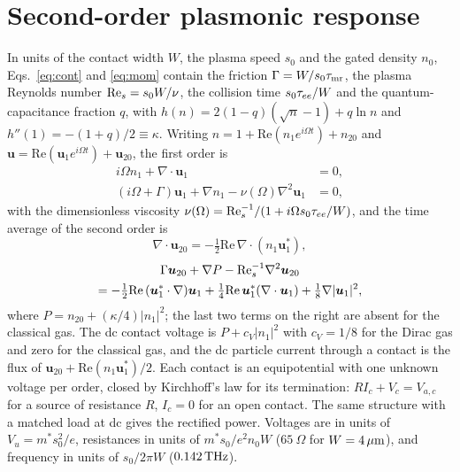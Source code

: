 \section{Second-order plasmonic response}
\label{app:perturbation}

In units of the contact width $W$, the plasma speed $s_{0}$ and the gated
density $n_{0}$, Eqs.~\eqref{eq:cont} and \eqref{eq:mom} contain the
friction $\Gamma=W/s_{0}\tau_{\mathrm{mr}}$, the plasma Reynolds number
$\mathrm{Re}_{s}=s_{0}W/\nu$, the collision time $s_{0}\tau_{ee}/W$ and the
quantum-capacitance fraction $q$, with
$h(n)=2(1-q)(\sqrt{n}-1)+q\ln n$ and $h''(1)=-(1+q)/2\equiv\kappa$. Writing
$n=1+\mathrm{Re}(n_{1}e^{i\Omega t})+n_{20}$ and
$\bm{u}=\mathrm{Re}(\bm{u}_{1}e^{i\Omega t})+\bm{u}_{20}$, the first order is
\begin{align}
i\Omega n_{1}+\nabla\cdot\bm{u}_{1}&=0,\\
(i\Omega+\Gamma)\bm{u}_{1}+\nabla n_{1}-\nu(\Omega)\nabla^{2}\bm{u}_{1}&=0,
\end{align}
with the dimensionless viscosity
$\nu(\Omega)=\mathrm{Re}_{s}^{-1}/(1+i\Omega s_{0}\tau_{ee}/W)$, and the time
average of the second order is
\begin{equation}
\nabla\cdot\bm{u}_{20}=-\tfrac12\mathrm{Re}\,\nabla\cdot(n_{1}\bm{u}_{1}^{*}),
\end{equation}
\begin{multline}
\Gamma\bm{u}_{20}+\nabla P-\mathrm{Re}_{s}^{-1}\nabla^{2}\bm{u}_{20}\\
=-\tfrac12\mathrm{Re}\,(\bm{u}_{1}^{*}\cdot\nabla)\bm{u}_{1}
+\tfrac14\mathrm{Re}\,\bm{u}_{1}^{*}(\nabla\cdot\bm{u}_{1})
+\tfrac18\nabla|\bm{u}_{1}|^{2},
\end{multline}
where $P=n_{20}+(\kappa/4)|n_{1}|^{2}$; the last two terms on the right
are absent for the classical gas. The dc contact voltage is
$P+c_{V}|n_{1}|^{2}$ with $c_{V}=1/8$ for the Dirac gas and zero for
the classical gas, and the dc particle current through a contact is the flux of
$\bm{u}_{20}+\mathrm{Re}(n_{1}\bm{u}_{1}^{*})/2$. Each contact is an
equipotential with one unknown voltage per order, closed by Kirchhoff's law
for its termination: $R I_{c}+V_{c}=V_{a,c}$ for a source of resistance $R$,
$I_{c}=0$ for an open contact. The same structure with a matched load at dc
gives the rectified power. Voltages are in units of
$V_{u}=m^{*}s_{0}^{2}/e$, resistances in units of
$m^{*}s_{0}/e^{2}n_{0}W$ ($65\ \Omega$ for $W=4\,\mu\mathrm{m}$), and frequency in units
of $s_{0}/2\pi W$ ($0.142\,\mathrm{THz}$).

